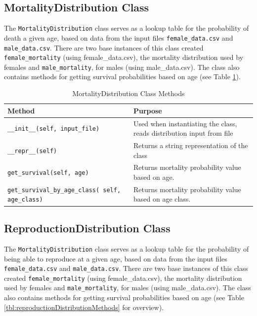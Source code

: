 \documentclass[authoryearcitations]{UoYCSproject}
\begin{document}
\newpage
\subsection{MortalityDistribution Class}
The \texttt{MortalityDistribution} class serves as a lookup table for the probability of death a given age, based on data from the input files \texttt{female\_data.csv} and \texttt{male\_data.csv}. There are two base instances of this class created \texttt{female\_mortality} (using female\_data.csv), the mortality distribution used by females and \texttt{male\_mortality}, for males (using male\_data.csv). The class also contains methods for getting survival probabilities based on age (see Table \ref{tbl:mortalityDistributionMethods}).

\begin{table}[h]
\caption{MortalityDistribution Class Methods}
\label{tbl:mortalityDistributionMethods}
\begin{tabular}{m{} m{}}
\textbf{Method} & \textbf{Purpose} \\\hline
\texttt{\_\_init\_\_(self, input\_file)} & Used when instantiating the class, reads distribution input from file\\\hline
\texttt{\_\_repr\_\_(self)} & Returns a string representation of the class \\\hline
\texttt{get\_survival(self, age)} & Returns mortality probability value based on age.\\\hline
\texttt{get\_survival\_by\_age\_class( self, age\_class)} &  Returns mortality probability value based on age class.
\end{tabular}
\end{table}

\newpage
\subsection{ReproductionDistribution Class}
The \texttt{MortalityDistribution} class serves as a lookup table for the probability of being able to reproduce at a given age, based on data from the input files \texttt{female\_data.csv} and \texttt{male\_data.csv}. There are two base instances of this class created \texttt{female\_mortality} (using female\_data.csv), the mortality distribution used by females and \texttt{male\_mortality}, for males (using male\_data.csv). The class also contains methods for getting survival probabilities based on age (see Table \ref{tbl:reproductionDistributionMethods} for overview).
\end{document}
